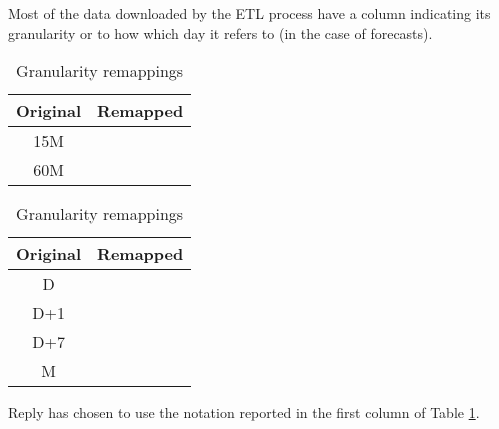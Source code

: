 Most of the data downloaded by the ETL process have a column indicating its granularity or to how which day it refers to (in the case of forecasts).

\begin{table}
    \centering
    \begin{tabular}{|c|c|}
        \toprule
        Original & Remapped \\
        \midrule
        15M& \\
        60M& \\
        \bottomrule
    \end{tabular}
    \caption{Granularity remappings}
    \label{tab:dwh:remapping:granularity}
\end{table}

\begin{table}
    \centering
    \begin{tabular}{|c|c|}
        \toprule
        Original & Remapped \\
        \midrule
        D& \\
        D+1& \\
        D+7& \\
        M& \\
        \bottomrule
    \end{tabular}
    \caption{Granularity remappings}
    \label{tab:dwh:remapping:granularity2}
\end{table}

Reply has chosen to use the notation reported in the first column of Table \ref{tab:dwh:remapping:granularity}.